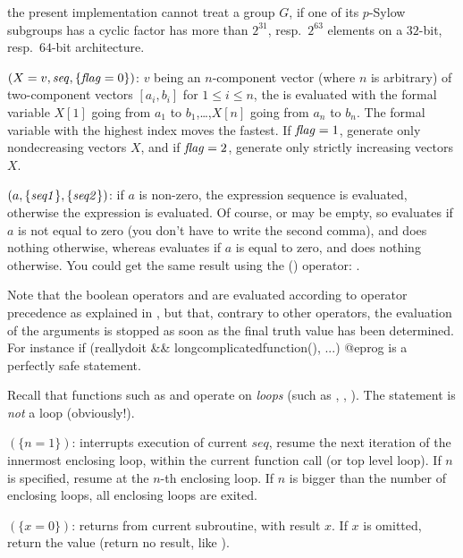 the present implementation cannot treat a group $G$, if
one of its $p$-Sylow subgroups has a cyclic factor has more than $2^{31}$,
resp.~$2^{63}$ elements on a $32$-bit, resp.~$64$-bit architecture.

$(X=v,\hbox{\it seq\/},\{\hbox{\it f\kern0pt lag\/}=0\})$: $v$ being an $n$-component
vector (where $n$ is arbitrary) of two-component vectors $[a_i,b_i]$
for $1\le i\le n$, the  is evaluated with the formal variable
$X[1]$ going from $a_1$ to $b_1$,\dots,$X[n]$ going from $a_n$ to $b_n$.
The formal variable with the highest index moves the fastest. If $\hbox{\it f\kern0pt lag\/}=1$,
generate only nondecreasing vectors $X$, and if $\hbox{\it f\kern0pt lag\/}=2$, generate only
strictly increasing vectors $X$.

$(a,\{\hbox{\it seq1\/}\},\{\hbox{\it seq2\/}\})$: if $a$ is non-zero,
the expression sequence  is evaluated, otherwise the expression
 is evaluated. Of course,  or  may be empty,
so  evaluates  if $a$ is not equal to zero
(you don't have to write the second comma), and does nothing otherwise,
whereas  evaluates  if $a$ is equal to
zero, and does nothing otherwise. You could get the same result using
the \kbd{!} () operator: .

  Note that the boolean operators \kbd{\&\&} and \kbd{||} are evaluated
according to operator precedence as explained in , but
that, contrary to other operators, the evaluation of the arguments is
stopped as soon as the final truth value has been determined. For instance
\bprog
if (reallydoit && longcomplicatedfunction(), ...)%
@eprog
\noindent is a perfectly safe statement.

  Recall that functions such as  and  operate on
\emph{loops} (such as , , ). The 
statement is \emph{not} a loop (obviously!).

$(\{n=1\})$: interrupts execution of current $seq$,
resume the next iteration of the innermost enclosing loop, within the
current function call (or top level loop). If $n$ is specified, resume at
the $n$-th enclosing loop. If $n$ is bigger than the number of enclosing
loops, all enclosing loops are exited.

$(\{x=0\})$: returns from current subroutine, with
result $x$. If $x$ is omitted, return the  value (return no
result, like ).

